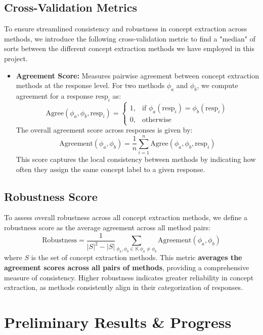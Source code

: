\documentclass{article}
\begin{document}
\subsection{Cross-Validation Metrics}

To ensure streamlined consistency and robustness in concept extraction across methods, we introduce the following cross-validation metric to find a "median" of sorts between the different concept extraction methods we have employed in this project. 

\begin{itemize}
    \item \textbf{Agreement Score:} Measures pairwise agreement between concept extraction methods at the response level. For two methods $\phi_a$ and $\phi_b$, we compute agreement for a response $\text{resp}_i$ as:
    \[
    \text{Agree}(\phi_a, \phi_b, \text{resp}_i) = 
    \begin{cases}
        1, & \text{if } \phi_a(\text{resp}_i) = \phi_b(\text{resp}_i) \\
        0, & \text{otherwise}
    \end{cases}
    \]
    The overall agreement score across responses is given by:
    \[
    \text{Agreement}(\phi_a, \phi_b) = \frac{1}{n} \sum_{i=1}^n \text{Agree}(\phi_a, \phi_b, \text{resp}_i)
    \]
    This score captures the local consistency between methods by indicating how often they assign the same concept label to a given response.
\end{itemize}

\subsection{Robustness Score}

To assess overall robustness across all concept extraction methods, we define a robustness score as the average agreement across all method pairs:
\[
\text{Robustness} = \frac{1}{|S|^2 - |S|} \sum_{\phi_a, \phi_b \in S, \phi_a \neq \phi_b} \text{Agreement}(\phi_a, \phi_b)
\]
where $S$ is the set of concept extraction methods. This metric \textbf{averages the agreement scores across all pairs of methods}, providing a comprehensive measure of consistency. Higher robustness indicates greater reliability in concept extraction, as methods consistently align in their categorization of responses.

\section{Preliminary Results \& Progress}
\end{document}
